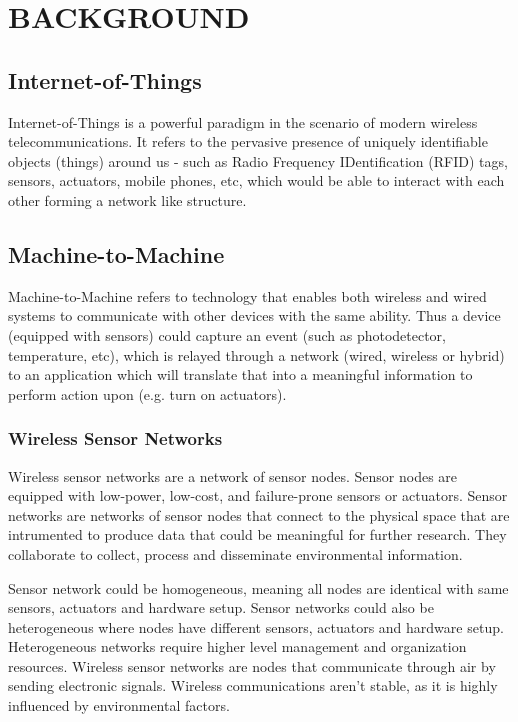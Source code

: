 \cleardoublepage
\singlespacing
\chapter{BACKGROUND}
\label{c:background}
\doublespacing\nointerlineskip

\section{Internet-of-Things}

Internet-of-Things is a powerful paradigm in the scenario of modern wireless
telecommunications. It refers to the pervasive presence of uniquely identifiable
objects (things) around us - such as Radio Frequency IDentification (RFID) tags,
sensors, actuators, mobile phones, etc, which would be able to interact with
each other forming a network like structure.~\cite{Atzori20102787}

\section{Machine-to-Machine}

Machine-to-Machine refers to technology that enables both wireless and wired
systems to communicate with other devices with the same ability. Thus a device
(equipped with sensors) could capture an event (such as photodetector,
    temperature, etc), which is relayed through a network (wired, wireless or
      hybrid) to an application which will translate that into a meaningful
    information to perform action upon (e.g. turn on actuators).

\subsection{Wireless Sensor Networks}

Wireless sensor networks are a network of sensor nodes.
Sensor nodes are equipped with low-power, low-cost, and failure-prone
sensors or actuators. Sensor networks are networks of sensor nodes that connect to the physical space that are intrumented to produce data that could be meaningful
for further research. They collaborate to collect, process and disseminate
environmental information\cite{ArchanaBharathidasan}.

Sensor network could be homogeneous, meaning all nodes are identical with same
sensors, actuators and hardware setup. Sensor networks could also be
heterogeneous where nodes have different sensors, actuators and hardware setup.
Heterogeneous networks require higher level management and organization
resources. Wireless sensor networks are nodes that communicate through air by
sending electronic signals. Wireless communications aren't stable, as it is
highly influenced by environmental factors.

